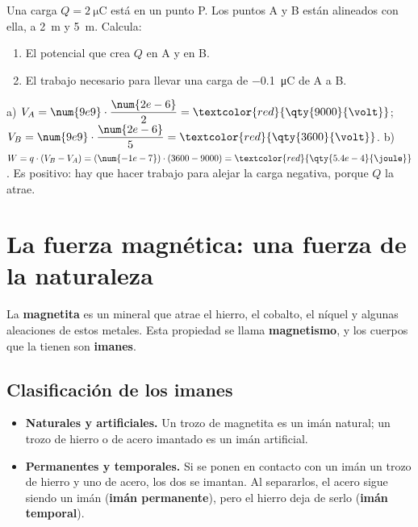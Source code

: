 \begin{exercise}
    Una carga \(Q = \qty{2}{\micro\coulomb}\) está en un punto P. Los puntos A y B están alineados con ella, a \qty{2}{\m} y \qty{5}{\m}. Calcula:
    \begin{enumerate}[label=\alph*)]
        \item El potencial que crea \(Q\) en A y en B.
        \item El trabajo necesario para llevar una carga de \qty{-0.1}{\micro\coulomb} de A a B.
    \end{enumerate}
    \begin{solu}
        a) \(V_A = \num{9e9} \cdot \dfrac{\num{2e-6}}{2} = \textcolor{red}{\qty{9000}{\volt}}\); \(V_B = \num{9e9} \cdot \dfrac{\num{2e-6}}{5} = \textcolor{red}{\qty{3600}{\volt}}\).
        b) \(W = q \cdot (V_B - V_A) = (\num{-1e-7}) \cdot (3600 - 9000) = \textcolor{red}{\qty{5.4e-4}{\joule}}\). Es positivo: hay que hacer trabajo para alejar la carga negativa, porque \(Q\) la atrae.
    \end{solu}
\end{exercise}

\section[La fuerza magnética]{La fuerza magnética: una fuerza de la naturaleza}

La \textbf{magnetita} es un mineral que atrae el hierro, el cobalto, el níquel y algunas aleaciones de estos metales. Esta propiedad se llama \textbf{magnetismo}, y los cuerpos que la tienen son \textbf{imanes}.

\subsection{Clasificación de los imanes}

\begin{itemize}
    \item \textbf{Naturales y artificiales.} Un trozo de magnetita es un imán natural; un trozo de hierro o de acero imantado es un imán artificial.
    \item \textbf{Permanentes y temporales.} Si se ponen en contacto con un imán un trozo de hierro y uno de acero, los dos se imantan. Al separarlos, el acero sigue siendo un imán (\textbf{imán permanente}), pero el hierro deja de serlo (\textbf{imán temporal}).
\end{itemize}

